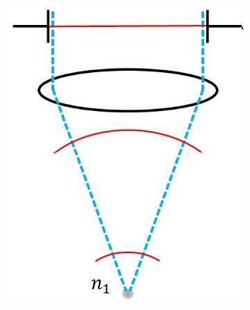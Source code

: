 \begin{figure}[h]
	\centering
	\begin{subfigure}[t]{0.3\textwidth}
		\centering
		\includegraphics[width=\linewidth]{images/wavefront_focus_ideal.jpg}
		\caption{}
		\label{fig:wavefront_focus_ideal}
	\end{subfigure}
	\begin{subfigure}[t]{0.3\textwidth}
		\centering

\end{subfigure}
\end{figure}
